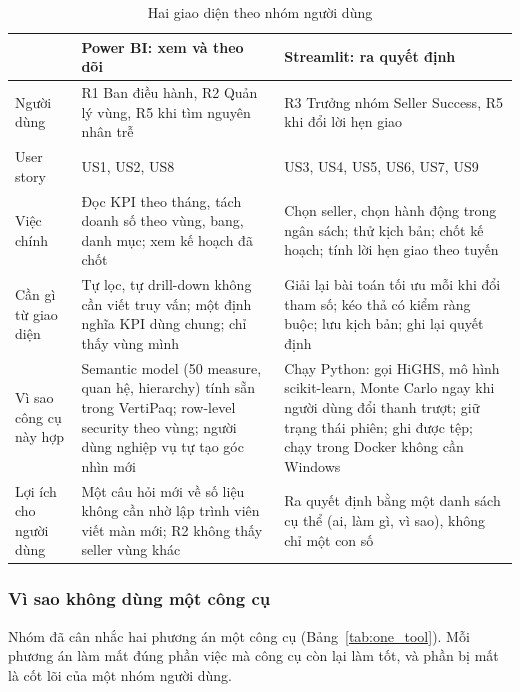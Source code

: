 \begin{table}[htbp]
\centering
\small
\caption{Hai giao diện theo nhóm người dùng}
\label{tab:two_ui}
\begin{tabularx}{\textwidth}{|>{\raggedright\arraybackslash}m{2.6cm}|L|L|}
\hline
 & \textbf{Power BI: xem và theo dõi} & \textbf{Streamlit: ra quyết định} \\
\hline
Người dùng & R1 Ban điều hành, R2 Quản lý vùng, R5 khi tìm nguyên nhân trễ & R3 Trưởng nhóm Seller Success, R5 khi đổi lời hẹn giao \\
\hline
User story & US1, US2, US8 & US3, US4, US5, US6, US7, US9 \\
\hline
Việc chính & Đọc KPI theo tháng, tách doanh số theo vùng, bang, danh mục; xem kế hoạch đã chốt & Chọn seller, chọn hành động trong ngân sách; thử kịch bản; chốt kế hoạch; tính lời hẹn giao theo tuyến \\
\hline
Cần gì từ giao diện & Tự lọc, tự drill-down không cần viết truy vấn; một định nghĩa KPI dùng chung; chỉ thấy vùng mình & Giải lại bài toán tối ưu mỗi khi đổi tham số; kéo thả có kiểm ràng buộc; lưu kịch bản; ghi lại quyết định \\
\hline
Vì sao công cụ này hợp & Semantic model (50 measure, quan hệ, hierarchy) tính sẵn trong VertiPaq; row-level security theo vùng; người dùng nghiệp vụ tự tạo góc nhìn mới & Chạy Python: gọi HiGHS, mô hình scikit-learn, Monte Carlo ngay khi người dùng đổi thanh trượt; giữ trạng thái phiên; ghi được tệp; chạy trong Docker không cần Windows \\
\hline
Lợi ích cho người dùng & Một câu hỏi mới về số liệu không cần nhờ lập trình viên viết màn mới; R2 không thấy seller vùng khác & Ra quyết định bằng một danh sách cụ thể (ai, làm gì, vì sao), không chỉ một con số \\
\hline
\end{tabularx}
\end{table}

\subsubsection*{Vì sao không dùng một công cụ}
Nhóm đã cân nhắc hai phương án một công cụ (Bảng~\ref{tab:one_tool}). Mỗi phương án làm mất đúng phần việc mà công cụ còn lại làm tốt, và phần bị mất là cốt lõi của một nhóm người dùng.

